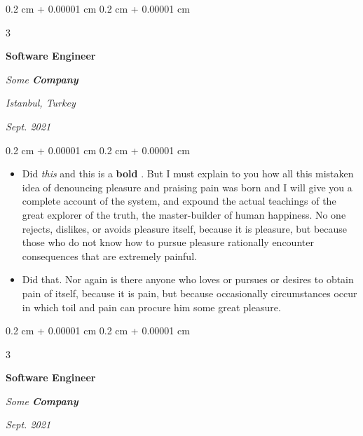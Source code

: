 \documentclass[10pt, letterpaper]{article}
\newenvironment{highlights}{
    \begin{itemize}[
        topsep=0.10 cm,
        parsep=0.10 cm,
        partopsep=0pt,
        itemsep=0pt,
        leftmargin=0.4 cm + 10pt + 0.6 cm
    ]
}{
    \end{itemize}
} %
\newenvironment{onecolentry}{
    \begin{adjustwidth}{
        0.2 cm + 0.00001 cm
    }{
        0.2 cm + 0.00001 cm
    }
}{
    \end{adjustwidth}
} %
\newenvironment{threecolentry}[3][]{
    \onecolentry
    \def\thirdColumn{#3}
    \setcolumnwidth{0.6 cm, \fill, 4.5 cm}
    \begin{paracol}{3}
    #2 \switchcolumn
}{
    \switchcolumn \raggedleft \thirdColumn
    \end{paracol}
    \endonecolentry
} %
\let\hrefWithoutArrow\href
\renewcommand{\href}[2]{\hrefWithoutArrow{#1}{\mbox{\ifthenelse{\equal{#2}{}}{ }{#2 }\raisebox{.15ex}{\footnotesize \faExternalLink*}}}}
\begin{document}
        \vspace{0.2 cm-3px}

        \begin{threecolentry}{
            \vspace*{\fill}
            \textbullet
            \vspace*{3px}
            \vspace*{\fill}
        }{
        \textit{Istanbul, Turkey}    
            
        \textit{Sept. 2021}}
            \textbf{Software Engineer}
            
            \textit{Some \textbf{Company}}
        \end{threecolentry}

        \vspace{0.10 cm-3px}
        \begin{onecolentry}
            \begin{highlights}
                \item Did \textit{this} and this is a \textbf{bold} \href{https://example.com}{link}. But I must explain to you how all this mistaken idea of denouncing pleasure and praising pain was born and I will give you a complete account of the system, and expound the actual teachings of the great explorer of the truth, the master-builder of human happiness. No one rejects, dislikes, or avoids pleasure itself, because it is pleasure, but because those who do not know how to pursue pleasure rationally encounter consequences that are extremely painful.
                \item Did that. Nor again is there anyone who loves or pursues or desires to obtain pain of itself, because it is pain, but because occasionally circumstances occur in which toil and pain can procure him some great pleasure.
            \end{highlights}
        \end{onecolentry}


        \vspace{0.2 cm-3px}

        \begin{threecolentry}{
            \vspace*{\fill}
            \textbullet
            \vspace*{3px}
            \vspace*{\fill}
        }{
            
            
        \textit{Sept. 2021}}
            \textbf{Software Engineer}
            
            \textit{Some \textbf{Company}}
        \end{threecolentry}
\end{document}
